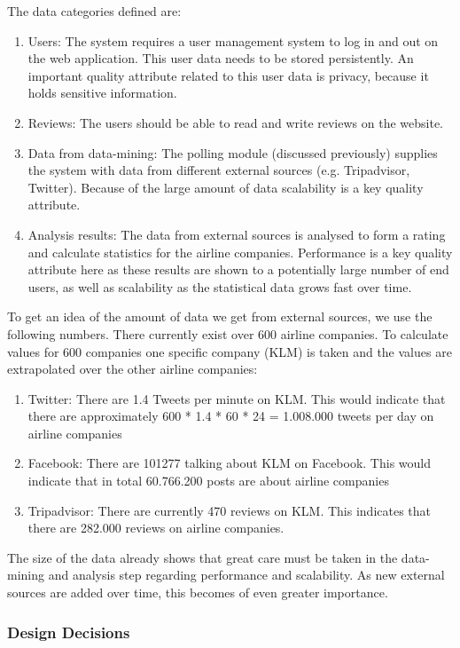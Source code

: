 \documentclass{article}
\begin{document}
The data categories defined are:
\begin{enumerate}
\item Users: The system requires a user management system to log in and out on the web application. This user data needs to be stored persistently. An important quality attribute related to this user data is privacy, because it holds sensitive information.
\item Reviews: The users should be able to read and write reviews on the website.
\item Data from data-mining: The polling module (discussed previously) supplies the system with data from different external sources (e.g. Tripadvisor, Twitter). Because of the large amount of data scalability is a key quality attribute.
\item Analysis results: The data from external sources is analysed to form a rating and calculate statistics for the airline companies. Performance is a key quality attribute here as these results are shown to a potentially large number of end users, as well as scalability as the statistical data grows fast over time.
\end{enumerate}

To get an idea of the amount of data we get from external sources, we use the following numbers. There currently exist over 600 airline companies. To calculate values for 600 companies one specific company (KLM) is taken and the values are extrapolated over the other airline companies:
\begin{enumerate}
\item Twitter: There are 1.4 Tweets per minute on KLM. This would indicate that there are approximately 600 * 1.4 * 60 * 24 = 1.008.000 tweets per day on airline companies
\item Facebook: There are 101277 talking about KLM on Facebook. This would indicate that in total 60.766.200 posts are about airline companies
\item Tripadvisor: There are currently 470 reviews on KLM. This indicates that there are 282.000 reviews on airline companies.
\end{enumerate}
The size of the data already shows that great care must be taken in the data-mining and analysis step regarding performance and scalability. As new external sources are added over time, this becomes of even greater importance.


\subsubsection{Design Decisions}
\end{document}

